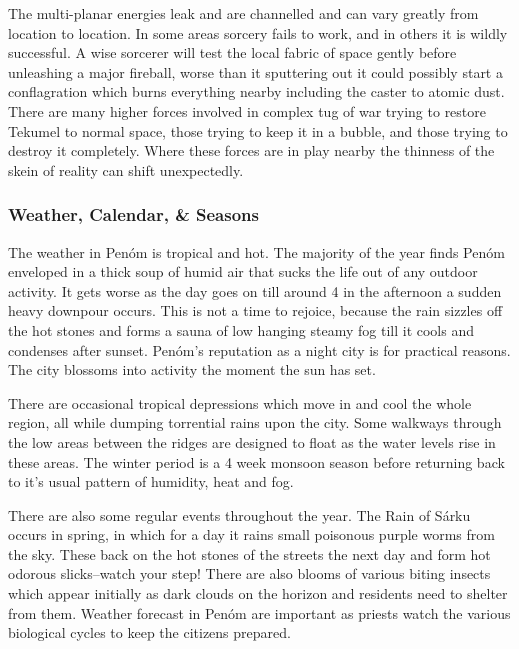 The multi-planar energies leak and are channelled and can vary greatly from location to location. In some areas sorcery fails to work, and in others it is wildly successful. A wise sorcerer will test the local fabric of space gently before unleashing a major fireball, worse than it sputtering out it could possibly start a conflagration which burns everything nearby including the caster to atomic dust. There are many higher forces involved in complex tug of war trying to restore Tekumel to normal space, those trying to keep it in a bubble, and those trying to destroy it completely. Where these forces are in play nearby the thinness of the skein of reality can shift unexpectedly.

\subsubsection{Weather, Calendar, \& Seasons}

The weather in Penóm is tropical and hot. The majority of the year finds Penóm enveloped in a thick soup of humid air that sucks the life out of any outdoor activity. It gets worse as the day goes on till around 4 in the afternoon a sudden heavy downpour occurs. This is not a time to rejoice, because the rain  sizzles off the hot stones and forms a sauna of low hanging steamy fog till it cools and condenses after sunset. Penóm's reputation as a night city is for practical reasons. The city blossoms into activity the moment the sun has set.

There are occasional tropical depressions which move in and cool the whole region, all while dumping torrential rains upon the city. Some walkways through the low areas between the ridges are designed to float as the water levels rise in these areas. The winter period is a 4 week monsoon season before returning back to it's usual pattern of humidity, heat and fog.

There are also some regular events throughout the year. The Rain of Sárku occurs in spring, in which for a day it rains small poisonous purple worms from the sky. These back on the hot stones of the streets the next day and form hot odorous slicks--watch your step! There are also blooms of various biting insects which appear initially as dark clouds on the horizon and residents need to shelter from them. Weather forecast in Penóm are important as priests watch the various biological cycles to keep the citizens prepared.

